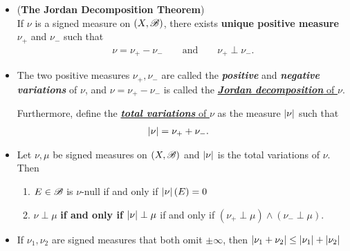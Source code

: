 \documentclass[11pt]{article}
\begin{document}
\begin{itemize}
\item  \begin{theorem}(\textbf{The Jordan Decomposition Theorem})\citep{folland2013real}\\
If $\nu$ is a signed measure on $(X,{\mathscr B})$, there exists \textbf{unique positive measure} $\nu_{+}$ and  $\nu_{-}$ such that 
\begin{align*}
\nu = \nu_{+} - \nu_{-} \qquad \text{and} \qquad \nu_{+} \perp \nu_{-}.
\end{align*}
\end{theorem}

\item \begin{definition}
The two positive measures $\nu_{+}, \nu_{-}$ are called the \emph{\textbf{positive}} and \emph{\textbf{negative variations}} of $\nu$, and $\nu= \nu_{+} - \nu_{-} $ is called the   \underline{\emph{\textbf{Jordan decomposition}} of $\nu$}.

Furthermore, define the \underline{\emph{\textbf{total variations}} of $\nu$} as the measure $\left\lvert \nu \right\rvert$ such that 
\begin{align*}
\left\lvert \nu \right\rvert &=  \nu_{+} + \nu_{-}.
\end{align*}
\end{definition}

\item \begin{proposition}
Let $\nu, \mu$ be  signed measures on $(X, {\mathscr B})$ and $\left\lvert \nu \right\rvert$ is the total variations of $\nu$.  Then
\begin{enumerate}
\item $E \in {\mathscr B}$ is $\nu$-null if and only if $\left\lvert \nu \right\rvert(E)=0$
\item $\nu \perp \mu$ \textbf{if and only if} $\left\lvert \nu \right\rvert\perp \mu$ if and only if $(\nu_{+} \perp \mu) \wedge (\nu_{-} \perp \mu)$.
\end{enumerate}
\end{proposition}

\item \begin{proposition}
If $\nu_1, \nu_2$ are signed measures that both omit $\pm \infty$, then $\left\lvert \nu_1 + \nu_2 \right\rvert \le \left\lvert \nu_1 \right\rvert + \left\lvert \nu_2 \right\rvert$
\end{proposition}
\end{itemize}
\end{document}
